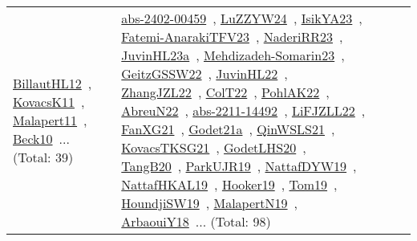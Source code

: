 {\begin{longtable}{lp{3cm}>{\raggedright\arraybackslash}p{6cm}>{\raggedright\arraybackslash}p{6cm}>{\raggedright\arraybackslash}p{8cm}}
\href{../works/BillautHL12.pdf}{BillautHL12}~\cite{BillautHL12}, \href{../works/KovacsK11.pdf}{KovacsK11}~\cite{KovacsK11}, \href{../works/Malapert11.pdf}{Malapert11}~\cite{Malapert11}, \href{../works/Beck10.pdf}{Beck10}~\cite{Beck10}... (Total: 39) & \href{../works/abs-2402-00459.pdf}{abs-2402-00459}~\cite{abs-2402-00459}, \href{../works/LuZZYW24.pdf}{LuZZYW24}~\cite{LuZZYW24}, \href{../works/IsikYA23.pdf}{IsikYA23}~\cite{IsikYA23}, \href{../works/Fatemi-AnarakiTFV23.pdf}{Fatemi-AnarakiTFV23}~\cite{Fatemi-AnarakiTFV23}, \href{../works/NaderiRR23.pdf}{NaderiRR23}~\cite{NaderiRR23}, \href{../works/JuvinHL23a.pdf}{JuvinHL23a}~\cite{JuvinHL23a}, \href{../works/Mehdizadeh-Somarin23.pdf}{Mehdizadeh-Somarin23}~\cite{Mehdizadeh-Somarin23}, \href{../works/GeitzGSSW22.pdf}{GeitzGSSW22}~\cite{GeitzGSSW22}, \href{../works/JuvinHL22.pdf}{JuvinHL22}~\cite{JuvinHL22}, \href{../works/ZhangJZL22.pdf}{ZhangJZL22}~\cite{ZhangJZL22}, \href{../works/ColT22.pdf}{ColT22}~\cite{ColT22}, \href{../works/PohlAK22.pdf}{PohlAK22}~\cite{PohlAK22}, \href{../works/AbreuN22.pdf}{AbreuN22}~\cite{AbreuN22}, \href{../works/abs-2211-14492.pdf}{abs-2211-14492}~\cite{abs-2211-14492}, \href{../works/LiFJZLL22.pdf}{LiFJZLL22}~\cite{LiFJZLL22}, \href{../works/FanXG21.pdf}{FanXG21}~\cite{FanXG21}, \href{../works/Godet21a.pdf}{Godet21a}~\cite{Godet21a}, \href{../works/QinWSLS21.pdf}{QinWSLS21}~\cite{QinWSLS21}, \href{../works/KovacsTKSG21.pdf}{KovacsTKSG21}~\cite{KovacsTKSG21}, \href{../works/GodetLHS20.pdf}{GodetLHS20}~\cite{GodetLHS20}, \href{../works/TangB20.pdf}{TangB20}~\cite{TangB20}, \href{../works/ParkUJR19.pdf}{ParkUJR19}~\cite{ParkUJR19}, \href{../works/NattafDYW19.pdf}{NattafDYW19}~\cite{NattafDYW19}, \href{../works/NattafHKAL19.pdf}{NattafHKAL19}~\cite{NattafHKAL19}, \href{../works/Hooker19.pdf}{Hooker19}~\cite{Hooker19}, \href{../works/Tom19.pdf}{Tom19}~\cite{Tom19}, \href{../works/HoundjiSW19.pdf}{HoundjiSW19}~\cite{HoundjiSW19}, \href{../works/MalapertN19.pdf}{MalapertN19}~\cite{MalapertN19}, \href{../works/ArbaouiY18.pdf}{ArbaouiY18}~\cite{ArbaouiY18}... (Total: 98)\\
\end{longtable}
}

